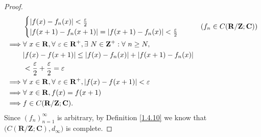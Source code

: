 \begin{proof}
\begin{align*}
                 & \begin{cases}
            \abs*{f(x) - f_n(x)} < \frac{\varepsilon}{2} \\
            \abs*{f(x + 1) - f_n(x + 1)} = \abs*{f(x + 1) - f_n(x)} < \frac{\varepsilon}{2}
        \end{cases}                                                                                         & (f_n \in C(\mathbf{R} / \mathbf{Z} ; \mathbf{C})) \\
        \implies & \forall\ x \in \mathbf{R}, \forall\ \varepsilon \in \mathbf{R}^+, \exists\ N \in \mathbf{Z}^+ : \forall\ n \geq N,                                                     \\
                 & \abs*{f(x) - f(x + 1)} \leq \abs*{f(x) - f_n(x)} + \abs*{f(x + 1) - f_n(x)}                                                                                            \\
                 & < \frac{\varepsilon}{2} + \frac{\varepsilon}{2} = \varepsilon                                                                                                          \\
        \implies & \forall\ x \in \mathbf{R}, \forall\ \varepsilon \in \mathbf{R}^+, \abs*{f(x) - f(x + 1)} < \varepsilon                                                                 \\
        \implies & \forall\ x \in \mathbf{R}, f(x) = f(x + 1)                                                                                                                             \\
        \implies & f \in C(\mathbf{R} / \mathbf{Z} ; \mathbf{C}).
    \end{align*}
    Since \((f_n)_{n = 1}^\infty\) is arbitrary, by Definition \ref{1.4.10} we know that \(\big(C(\mathbf{R} / \mathbf{Z} ; \mathbf{C}), d_\infty\big)\) is complete.
\end{proof}
